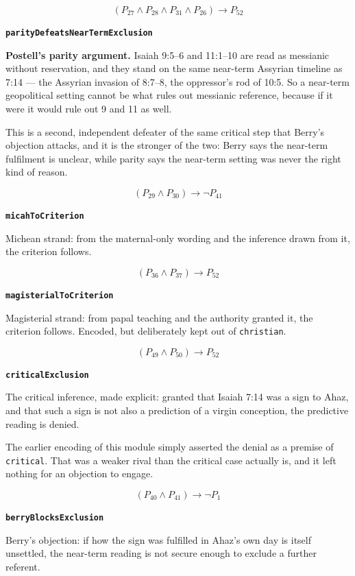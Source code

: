 \documentclass[11pt]{article}
\begin{document}
\[(P_{27} \land P_{28} \land P_{31} \land P_{26}) \rightarrow P_{52}\]
\par\medskip\noindent\textbf{\texttt{parity\allowbreak{}Defeats\allowbreak{}Near\allowbreak{}Term\allowbreak{}Exclusion}}\par\nobreak\noindent
\textbf{Postell's parity argument.} Isaiah 9:5–6 and 11:1–10 are read as messianic without reservation, and they stand on the same near-term Assyrian timeline as 7:14 — the Assyrian invasion of 8:7–8, the oppressor's rod of 10:5. So a near-term geopolitical setting cannot be what rules out messianic reference, because if it were it would rule out 9 and 11 as well.

This is a second, independent defeater of the same critical step that Berry's objection attacks, and it is the stronger of the two: Berry says the near-term fulfilment is unclear, while parity says the near-term setting was never the right kind of reason.

\[(P_{29} \land P_{30}) \rightarrow \lnot P_{41}\]
\par\medskip\noindent\textbf{\texttt{micah\allowbreak{}To\allowbreak{}Criterion}}\par\nobreak\noindent
Michean strand: from the maternal-only wording and the inference drawn from it, the criterion follows.

\[(P_{36} \land P_{37}) \rightarrow P_{52}\]
\par\medskip\noindent\textbf{\texttt{magisterial\allowbreak{}To\allowbreak{}Criterion}}\par\nobreak\noindent
Magisterial strand: from papal teaching and the authority granted it, the criterion follows. Encoded, but deliberately kept out of \texttt{christian}.

\[(P_{49} \land P_{50}) \rightarrow P_{52}\]
\par\medskip\noindent\textbf{\texttt{critical\allowbreak{}Exclusion}}\par\nobreak\noindent
The critical inference, made explicit: granted that Isaiah 7:14 was a sign to Ahaz, and that such a sign is not also a prediction of a virgin conception, the predictive reading is denied.

The earlier encoding of this module simply asserted the denial as a premise of \texttt{critical}. That was a weaker rival than the critical case actually is, and it left nothing for an objection to engage.

\[(P_{40} \land P_{41}) \rightarrow \lnot P_{1}\]
\par\medskip\noindent\textbf{\texttt{berry\allowbreak{}Blocks\allowbreak{}Exclusion}}\par\nobreak\noindent
Berry's objection: if how the sign was fulfilled in Ahaz's own day is itself unsettled, the near-term reading is not secure enough to exclude a further referent.
\end{document}
